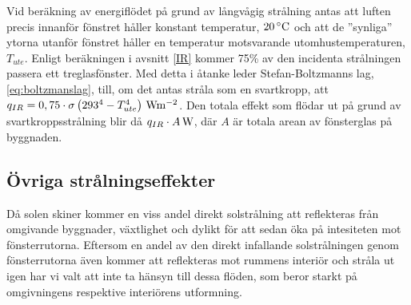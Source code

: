 Vid beräkning av energiflödet på grund av långvågig strålning antas att luften precis innanför fönstret håller konstant temperatur, $\unit[20]{^{\circ}C}$ och att de ''synliga'' ytorna utanför fönstret håller en temperatur motsvarande utomhustemperaturen, $T_{ute}$. Enligt beräkningen i avsnitt \ref{IR} kommer 75\% av den incidenta strålningen passera ett treglasfönster. Med detta i åtanke leder Stefan-Boltzmanns lag, \eqref{eq:boltzmanslag}, till, om det antas stråla som en svartkropp, att $q_{IR} = 0,75 \cdot \sigma \unit[\left( 293^4 - T_{ute}^4\right)]{Wm^{-2}}$. Den totala effekt som flödar ut på grund av svartkroppsstrålning blir då $\unit[q_{IR}\cdot A]{W}$, där $A$ är totala arean av fönsterglas på byggnaden.

\subsection{Övriga strålningseffekter}

Då solen skiner kommer en viss andel direkt solstrålning att reflekteras från omgivande byggnader, växtlighet och dylikt för att sedan öka på intesiteten mot fönsterrutorna. Eftersom en andel av den direkt infallande solstrålningen genom fönsterrutorna även kommer att reflekteras mot rummens interiör och stråla ut igen har vi valt att inte ta hänsyn till dessa flöden, som beror starkt på omgivningens respektive interiörens utformning.

